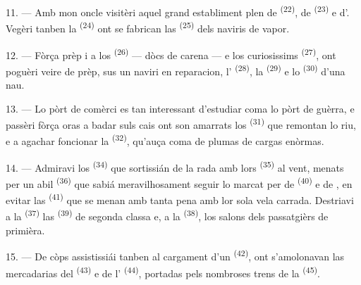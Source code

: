 \VUsaut{3.0mm}
\VUsaut{3.0mm}

11. --- Amb mon oncle visitèri aquel grand establiment plen de 
\textsuperscript{(22)}, de  \textsuperscript{(23)} e
d'. Vegèri tanben la 
\textsuperscript{(24)} ont se fabrican las 
\textsuperscript{(25)} dels naviris de vapor.

12. --- Fòrça prèp i a los  \textsuperscript{(26)} --- dòcs de carena
--- e los curiosissims  \textsuperscript{(27)}, ont poguèri
veire de prèp, sus un naviri en reparacion, l'
\textsuperscript{(28)}, la  \textsuperscript{(29)} e lo
 \textsuperscript{(30)} d'una nau.

13. --- Lo pòrt de comèrci es tan interessant d'estudiar coma lo pòrt de guèrra,
e passèri fòrça oras a badar suls cais ont son amarrats los  \textsuperscript{(31)} que remontan lo riu, e a agachar foncionar la
 \textsuperscript{(32)}, qu'auça coma de plumas de cargas
enòrmas.

\VUsaut{4.0mm}
\VUsaut{3.0mm}

14. --- Admiravi los  \textsuperscript{(34)} que sortissián
de la rada amb lors  \textsuperscript{(35)} al vent, menats per
un abil  \textsuperscript{(36)} que sabiá meravilhosament seguir lo
 marcat per de  \textsuperscript{(40)} e de
, en evitar las  \textsuperscript{(41)} que se
menan amb tanta pena amb lor sola vela carrada. Destriavi a la 
\textsuperscript{(37)} las  \textsuperscript{(39)} de segonda
classa e, a la  \textsuperscript{(38)}, los salons dels passatgièrs
de primièra.

15. --- De còps assistissiái tanben al cargament d'un 
\textsuperscript{(42)}, ont s'amolonavan las mercadarias del 
\textsuperscript{(43)} e de l' \textsuperscript{(44)},
portadas pels nombroses trens de la 
\textsuperscript{(45)}.

\VUsaut{3.0mm}
\VUsaut{3.0mm}

